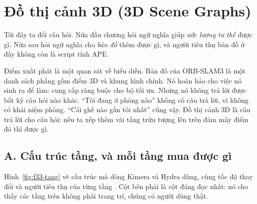 \documentclass[../../deep_learning.tex]{subfiles}
\begin{document}
\section{Đồ thị cảnh 3D (3D Scene Graphs)}
Tới đây ta đổi câu hỏi. Nửa đầu chương hỏi ngữ nghĩa giúp \emph{ước lượng tư thế} được gì. Nửa sau hỏi ngữ nghĩa cho \emph{bản đồ} thêm được gì, và người tiêu thụ bản đồ ở đây không còn là script tính APE.

Điểm xuất phát là một quan sát về biểu diễn. Bản đồ của ORB-SLAM3 là một danh sách phẳng gồm điểm 3D và khung hình chính. Nó hoàn hảo cho việc nó sinh ra để làm: cung cấp ràng buộc cho bộ tối ưu. Nhưng nó không trả lời được bất kỳ câu hỏi nào khác. ``Tôi đang ở phòng nào'' không có câu trả lời, vì không có khái niệm phòng. ``Cái ghế nào gần tôi nhất'' cũng vậy. Đồ thị cảnh 3D là câu trả lời cho câu hỏi: nếu ta xếp thêm vài tầng trừu tượng lên trên đám mây điểm đó thì được gì.

\subsection{A. Cấu trúc tầng, và mỗi tầng mua được gì}
Hình~\ref{fig:f33-tang} vẽ cấu trúc mà dòng Kimera và Hydra dùng, cùng tốc độ thay đổi và người tiêu thụ của từng tầng \cite{rosinol2020dsg,hughes2022hydra}. Cột bên phải là cột đáng đọc nhất: nó cho thấy các tầng trên không phải trang trí, chúng có người dùng thật.
\end{document}
